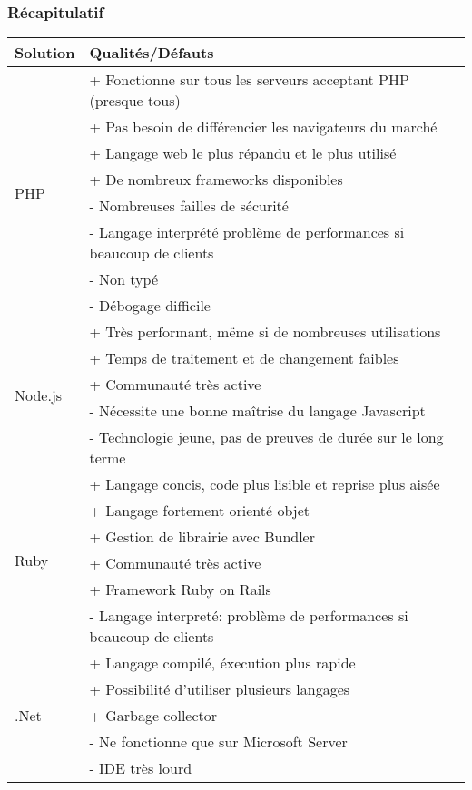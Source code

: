         \subsubsection{Récapitulatif}
        \label{recap}
        \begin{tabular}{|l|l|}
            \hline
            Solution & Qualités/Défauts \\ \hline
            \multirow{8}{*}{PHP} & + Fonctionne sur tous les serveurs acceptant PHP (presque tous) \\
                & + Pas besoin de différencier les navigateurs du marché \\
                & + Langage web le plus répandu et le plus utilisé \\
                & + De nombreux frameworks disponibles \\
                & - Nombreuses failles de sécurité \\
                & - Langage interprété problème de performances si beaucoup de clients \\
                & - Non typé \\
                & - Débogage difficile \\ \hline
            \multirow{5}{*}{Node.js} & + Très performant, mëme si de nombreuses utilisations \\
                & + Temps de traitement et de changement faibles \\
                & + Communauté très active \\
                & - Nécessite une bonne maîtrise du langage Javascript \\
                & - Technologie jeune, pas de preuves de durée sur le long terme \\ \hline
            \multirow{6}{*}{Ruby} & + Langage concis, code plus lisible et reprise plus aisée \\
                & + Langage fortement orienté objet \\
                & + Gestion de librairie avec Bundler \\
                & + Communauté très active \\
                & + Framework Ruby on Rails \\
                & - Langage interpreté: problème de performances si beaucoup de clients \\ \hline
                \multirow{6}{*}{.Net} & + Langage compilé, éxecution plus rapide \\
                & + Possibilité d'utiliser plusieurs langages \\
                & + Garbage collector \\
                & - Ne fonctionne que sur Microsoft Server \\
                & - IDE très lourd \\ 
            \hline
        \end{tabular}

